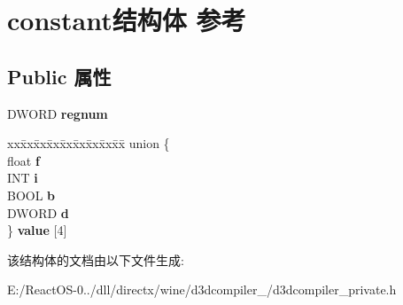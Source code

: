 \hypertarget{structconstant}{}\section{constant结构体 参考}
\label{structconstant}
\subsection*{Public 属性}
\begin{DoxyCompactItemize}
\item 
\mbox{\label{structconstant_af4f34ea3696daa74dc37e23329560d92}} 
D\+W\+O\+RD {\bfseries regnum}
\item 
\mbox{\label{structconstant_adb3e5175096f979fbd4e5f2f9d017e24}} 
\begin{tabbing}
xx\=xx\=xx\=xx\=xx\=xx\=xx\=xx\=xx\=\kill
union \{\\
\>float {\bfseries f}\\
\>INT {\bfseries i}\\
\>BOOL {\bfseries b}\\
\>DWORD {\bfseries d}\\
\} {\bfseries value} \mbox{[}4\mbox{]}\\

\end{tabbing}\end{DoxyCompactItemize}


该结构体的文档由以下文件生成\+:\begin{DoxyCompactItemize}
\item 
E\+:/\+React\+O\+S-\/0../dll/directx/wine/d3dcompiler\+\_/d3dcompiler\+\_\+private.\+h\end{DoxyCompactItemize}
